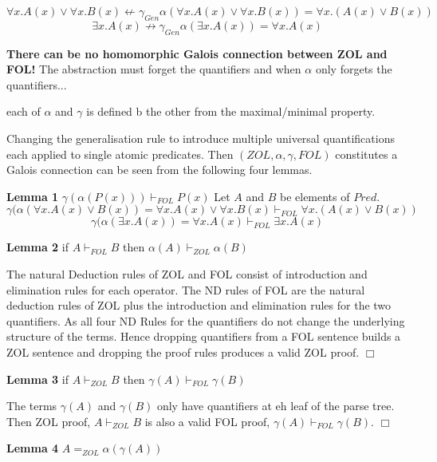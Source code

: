    \[\forall x.A(x) \vee \forall x.B(x) \not\leftarrow \gamma_{Gen}\alpha(\forall x.A(x)\vee \forall x.B(x)) = \forall x. (A(x) \vee B(x))\]
  \[ \exists x. A(x) \not\rightarrow \gamma_{Gen} \alpha(\exists x. A(x)) = \forall x. A(x) \]
  
 {\bf There can be no homomorphic Galois connection between ZOL and FOL!}  The abstraction must forget the quantifiers and when $\alpha$ only forgets the quantifiers...
 
 each of $\alpha$ and $\gamma$ is defined b the other from the maximal/minimal property.
 
  Changing the generalisation rule to introduce multiple  universal quantifications each  applied  to single  atomic predicates. Then $(ZOL, \alpha, \gamma,  FOL)$ constitutes a Galois connection can be seen from the following four lemmas.
  
% 
  {\bf Lemma 1}   $\gamma(\alpha(P(x))) \vdash_{FOL} P(x)$ 
Let $A$ and $B$ be elements of $Pred$.
\[\gamma(\alpha(\forall x.A(x)\vee B(x)) = \forall x.A(x)\vee\forall x.B(x)  \vdash_{FOL}\forall x. (A(x) \vee B(x))\]
\[ \gamma(\alpha(\exists x. A(x)) =  \forall x. A(x) \vdash_{FOL}  \exists x. A(x) \]

  
{\bf Lemma 2} if $A\vdash_{FOL} B$   then $\alpha(A)\vdash_{ZOL} \alpha(B)$

The natural Deduction rules of ZOL and FOL consist of introduction and elimination rules for each operator. The ND rules of FOL are the natural deduction rules of ZOL plus the introduction and elimination rules for the two quantifiers. As all four ND Rules for the quantifiers do not change the underlying structure of the terms. Hence  dropping quantifiers from a FOL sentence builds a ZOL sentence and dropping the proof rules  produces a valid ZOL proof.\hspace{\fill} $\Box$
 
 {\bf Lemma 3} if $A\vdash_{ZOL} B$   then $\gamma(A)\vdash_{FOL} \gamma(B)$

The terms   $\gamma(A)$ and $\gamma(B)$ only have quantifiers at eh leaf of the parse tree. Then ZOL proof, $A\vdash_{ZOL} B$  is also a valid FOL proof, $\gamma(A)\vdash_{FOL} \gamma(B)$. \hspace{\fill} $\Box$

{\bf Lemma 4}  $A =_{ZOL} \alpha(\gamma(A))$ 

